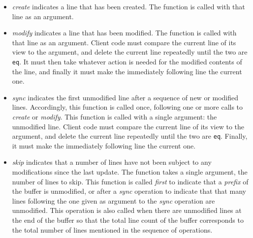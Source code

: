 \begin{itemize}
\item \textit{create} indicates a line that has been created.  The
  function is called with that line as an argument.
\item \textit{modify} indicates a line that has been modified.  The
  function is called with that line as an argument.  Client code must
  compare the current line of its view to the argument, and delete the
  current line repeatedly until the two are \texttt{eq}.  It
  must then take whatever action is needed for the modified contents
  of the line, and finally it must make the immediately following line
  the current one.
\item \textit{sync} indicates the first unmodified line after a
  sequence of new or modified lines.  Accordingly, this function is
  called once, following one or more calls to \textit{create} or
  \textit{modify}.  This function is called with a single argument:
  the unmodified line.  Client code must compare the current line of
  its view to the argument, and delete the current line repeatedly
  until the two are \texttt{eq}.  Finally, it must make the
  immediately following line the current one.
\item \textit{skip} indicates that a number of lines have not been
  subject to any modifications since the last update.  The function
  takes a single argument, the number of lines to skip.  This function
  is called \emph{first} to indicate that a \emph{prefix} of the
  buffer is unmodified, or after a \emph{sync} operation to indicate
  that that many lines following the one given as argument to the
  \textit{sync} operation are unmodified.  This operation is also
  called when there are unmodified lines at the end of the buffer so
  that the total line count of the buffer corresponds to the total
  number of lines mentioned in the sequence of operations.
\end{itemize}

